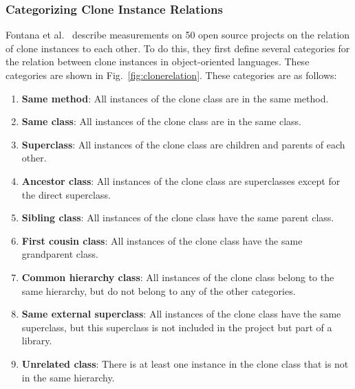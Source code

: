 \documentclass[a4paper]{article}
\begin{document}
\subsubsection{Categorizing Clone Instance Relations}\label{chap:catcloneinstancerelations}
Fontana et al.~\cite{fontana2015duplicated} describe measurements on 50 open source projects on the relation of clone instances to each other. To do this, they first define several categories for the relation between clone instances in object-oriented languages. These categories are shown in Fig.~\ref{fig:clonerelation}. These categories are as follows:
\begin{enumerate}
  \item \textbf{Same method}: All instances of the clone class are in the same method.
  \item \textbf{Same class}: All instances of the clone class are in the same class.
  \item \textbf{Superclass}: All instances of the clone class are children and parents of each other.
  \item \textbf{Ancestor class}: All instances of the clone class are superclasses except for the direct superclass.
  \item \textbf{Sibling class}: All instances of the clone class have the same parent class.
  \item \textbf{First cousin class}: All instances of the clone class have the same grandparent class.
\item \textbf{Common hierarchy class}: All instances of the clone class belong to the same hierarchy, but do not belong to any of the other categories.
\item \textbf{Same external superclass}: All instances of the clone class have the same superclass, but this superclass is not included in the project but part of a library.
\item \textbf{Unrelated class}: There is at least one instance in the clone class that is not in the same hierarchy.
\end{enumerate}
\end{document}
